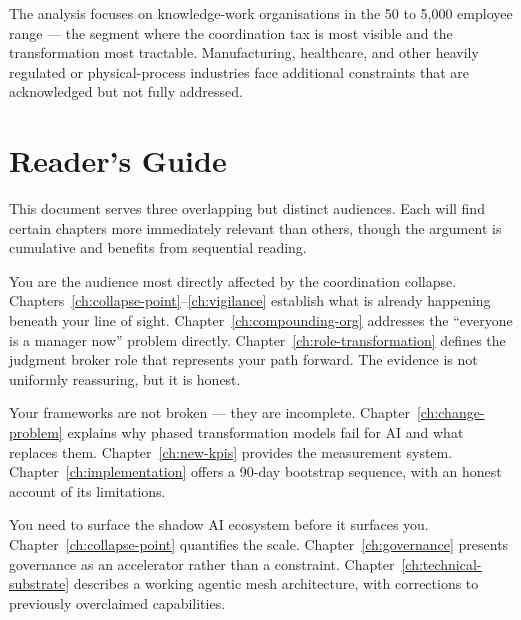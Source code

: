 The analysis focuses on knowledge-work organisations in the 50 to 5,000 employee range --- the segment where the coordination tax is most visible and the transformation most tractable. Manufacturing, healthcare, and other heavily regulated or physical-process industries face additional constraints that are acknowledged but not fully addressed.

\section{Reader's Guide}
\label{sec:readers-guide}

This document serves three overlapping but distinct audiences. Each will find certain chapters more immediately relevant than others, though the argument is cumulative and benefits from sequential reading.

\begin{keyinsight}[title={Who This Report Is For}]
\begin{description}[style=nextline, leftmargin=2em]
  \item[Middle Managers and Team Leaders] You are the audience most directly affected by the coordination collapse. Chapters~\ref{ch:collapse-point}--\ref{ch:vigilance} establish what is already happening beneath your line of sight. Chapter~\ref{ch:compounding-org} addresses the ``everyone is a manager now'' problem directly. Chapter~\ref{ch:role-transformation} defines the judgment broker role that represents your path forward. The evidence is not uniformly reassuring, but it is honest.

  \item[Change Managers and Transformation Leaders] Your frameworks are not broken --- they are incomplete. Chapter~\ref{ch:change-problem} explains why phased transformation models fail for AI and what replaces them. Chapter~\ref{ch:new-kpis} provides the measurement system. Chapter~\ref{ch:implementation} offers a 90-day bootstrap sequence, with an honest account of its limitations.

  \item[AI Strategy Leaders and Chief Technology Officers] You need to surface the shadow AI ecosystem before it surfaces you. Chapter~\ref{ch:collapse-point} quantifies the scale. Chapter~\ref{ch:governance} presents governance as an accelerator rather than a constraint. Chapter~\ref{ch:technical-substrate} describes a working agentic mesh architecture, with corrections to previously overclaimed capabilities.
\end{description}
\end{keyinsight}


